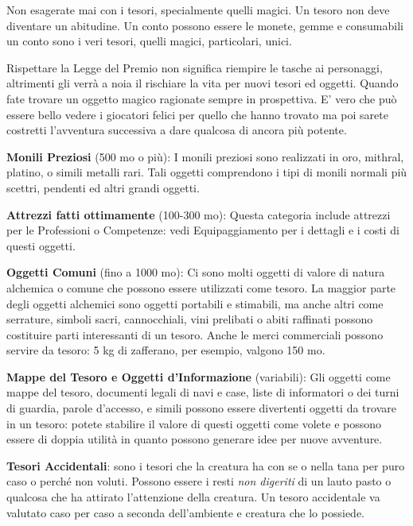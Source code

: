 \begin{multicols}{2}
\medskip

\begin{changemargin}{0.3cm}{0.3cm}\begin{narratore}
Non esagerate mai con i tesori, specialmente quelli magici. Un tesoro non deve diventare un abitudine. Un conto possono essere le monete, gemme e consumabili un conto sono i veri tesori, quelli magici, particolari, unici.

Rispettare la Legge del Premio non significa riempire le tasche ai personaggi, altrimenti gli verrà a noia il rischiare la vita per nuovi tesori ed oggetti. Quando fate trovare un oggetto magico ragionate sempre in prospettiva. E' vero che può essere bello vedere i giocatori felici per quello che hanno trovato ma poi sarete costretti l'avventura successiva a dare qualcosa di ancora più potente.
\end{narratore}\end{changemargin}

\medskip

\textbf{Monili Preziosi} (500 mo o più): I monili preziosi sono realizzati in oro, mithral, platino, o simili metalli rari. Tali oggetti comprendono i tipi di monili normali più scettri, pendenti ed altri grandi oggetti.

\textbf{Attrezzi fatti ottimamente} (100-300 mo): Questa categoria include attrezzi per le Professioni o Competenze: vedi Equipaggiamento per i dettagli e i costi di questi oggetti.

\textbf{Oggetti Comuni} (fino a 1000 mo): Ci sono molti oggetti di valore di natura alchemica o comune che possono essere utilizzati come tesoro. La maggior parte degli oggetti alchemici sono oggetti portabili e stimabili, ma anche altri come serrature, simboli sacri, cannocchiali, vini prelibati o abiti raffinati possono costituire parti interessanti di un tesoro. Anche le merci commerciali possono servire da tesoro: 5 kg di zafferano, per esempio, valgono 150 mo.

\textbf{Mappe del Tesoro e Oggetti d'Informazione} (variabili): Gli oggetti come mappe del tesoro, documenti legali di navi e case, liste di informatori o dei turni di guardia, parole d'accesso, e simili possono essere divertenti oggetti da trovare in un tesoro: potete stabilire il valore di questi oggetti come volete e possono essere di doppia utilità in quanto possono generare idee per nuove avventure.

\textbf{Tesori Accidentali}: sono i tesori che la creatura ha con se o nella tana per puro caso o perché non voluti. Possono essere i resti \emph{non digeriti} di un lauto pasto o qualcosa che ha attirato l'attenzione della creatura. Un tesoro accidentale  va valutato caso per caso a seconda dell'ambiente e creatura che lo possiede.


\end{multicols}
